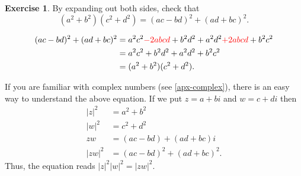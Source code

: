 \documentclass[a4paper]{book}
\theoremstyle{definition}
\newtheorem{exercise}[theorem]{Exercise}
\renewenvironment{solution}{\SolutionInline}{\endSolutionInline}
\begin{document}
\begin{exercise}
 By expanding out both sides, check that
 \[ (a^2+b^2)(c^2+d^2) = (ac-bd)^2 + (ad+bc)^2. \]
\end{exercise}
\begin{solution}
 \begin{align*}
  (ac-bd)^2 + (ad+bc)^2 &=
   a^2c^2 {\color{red} - 2abcd} + b^2d^2 +
   a^2d^2 {\color{red} + 2abcd} + b^2c^2 \\
   &= a^2c^2 + b^2d^2 + a^2d^2 + b^2c^2 \\
   &= (a^2+b^2)(c^2+d^2).
 \end{align*}
\end{solution}
\begin{background}
 If you are familiar with complex numbers (see
 \autoref{apx-complex}), there is an easy way to understand the
 above equation.  If we put $z=a+bi$ and $w=c+di$ then
 \begin{align*}
  |z|^2  &= a^2 + b^2 \\
  |w|^2  &= c^2 + d^2 \\
  zw     &= (ac-bd) + (ad+bc)i \\
  |zw|^2 &= (ac-bd)^2 + (ad+bc)^2.
 \end{align*}
 Thus, the equation reads $|z|^2|w|^2=|zw|^2$.
\end{background}
\end{document}
